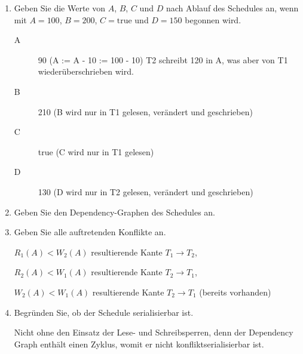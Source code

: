\documentclass{bschlangaul-aufgabe}
\begin{document}
\begin{enumerate}


\item Geben Sie die Werte von $A$, $B$, $C$ und $D$ nach Ablauf des
Schedules an, wenn mit $A = 100$, $B = 200$, $C = \text{true}$ und $D =
150$ begonnen wird.

\begin{liAntwort}
\begin{description}
\item[A] 90 (A := A - 10 := 100 - 10) T2 schreibt 120 in A, was aber von T1 wiederüberschrieben wird.
\item[B] 210 (B wird nur in T1 gelesen, verändert und geschrieben)
\item[C] true (C wird nur in T1 gelesen)
\item[D] 130 (D wird nur in T2 gelesen, verändert und geschrieben)
\end{description}
\end{liAntwort}


\item Geben Sie den Dependency-Graphen des Schedules an.

\begin{liAntwort}
\end{liAntwort}


\item Geben Sie alle auftretenden Konflikte an.

\begin{liAntwort}
$R_1(A) < W_2(A)$ resultierende Kante $T_1 \rightarrow T_2$,

$R_2(A) < W_1(A)$ resultierende Kante $T_2 \rightarrow T_1$,

$W_2(A) < W_1(A)$ resultierende Kante $T_2 \rightarrow T_1$ (bereits vorhanden)
\end{liAntwort}


\item Begründen Sie, ob der Schedule serialisierbar ist.

\begin{liAntwort}
Nicht ohne den Einsatz der Lese- und Schreibsperren, denn der Dependency
Graph enthält einen Zyklus, womit er nicht konfliktserialisierbar ist.
\end{liAntwort}


\end{enumerate}
\end{document}
